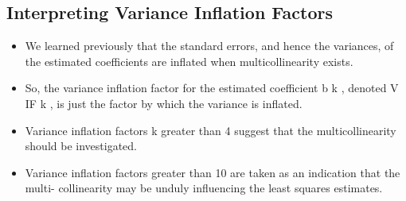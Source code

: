 \documentclass[a4paper,12pt]{article}
\begin{document}
\subsection{Interpreting Variance Inflation Factors}
\begin{itemize}
\item We learned previously that the standard errors, and hence the variances, of the estimated
coefficients are inflated when multicollinearity exists.


\item So, the variance inflation factor for the estimated coefficient b k , denoted V IF k , is just the
factor by which the variance is inflated.
\item Variance inflation factors k greater than 4 suggest that the multicollinearity should be
investigated.
\item Variance inflation factors greater than 10 are taken as an indication that the multi-
collinearity may be unduly influencing the least squares estimates.
\end{itemize}


\end{document}
